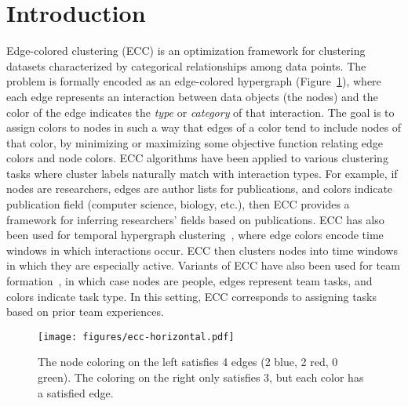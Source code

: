 \section{Introduction}
\label{sec:intro}
Edge-colored clustering (ECC) is an optimization framework for clustering datasets characterized by {categorical} relationships among data points. The problem is formally encoded as an edge-colored hypergraph (Figure~\ref{fig:eccbalance}), where each edge represents an interaction between data objects (the nodes) and the color of the edge indicates the \emph{type} or \emph{category} of that interaction. The goal is to assign colors to nodes in such a way that edges of a color tend to include nodes of that color, by minimizing or maximizing some objective function relating edge colors and node colors.
ECC algorithms have been applied to various clustering tasks where cluster labels naturally match with interaction types. For example, if nodes are researchers, edges are author lists for publications, and colors indicate publication field (computer science, biology, etc.), then ECC provides a framework for inferring researchers' fields based on publications. ECC has also been used for temporal hypergraph clustering~\cite{amburg2020clustering}, where edge colors encode time windows in which interactions occur. ECC then clusters nodes into time windows in which they are especially active. Variants of ECC have also been used for team formation~\cite{amburg2022diverse}, in which case nodes are people, edges represent team tasks, and colors indicate task type. In this setting, ECC corresponds to assigning tasks based on prior team experiences.
\begin{figure}[t]
	\centering
	\texttt{[image: figures/ecc-horizontal.pdf]}
	\vspace{-5pt}
	\caption{The node coloring on the left satisfies 4 edges (2 blue, 2 red, 0 green). The coloring on the right only satisfies 3, but each color has a satisfied edge.}
	\label{fig:eccbalance}
\end{figure}


